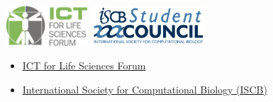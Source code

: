 \documentclass[10pt,]{article}
\begin{document}
 \vspace{2ex}
\begin{minipage}[c]{0.5\columnwidth}
    \centering
    \includegraphics[height=15mm]{./images/ICT-for-Life-Sciences-Forum-logo.png}\quad
    \includegraphics[height=15mm]{./images/ISCBSC-logo.png}
\end{minipage}
\begin{minipage}[c]{0.5\columnwidth}
\begin{itemize}
    \itemsep1pt\parskip0pt
    \item
      \href{http://www.ict4lifesciences.org.au}{ICT for Life Sciences Forum}
    \item
      \href{http://www.iscb.org}{International Society for Computational
      Biology (ISCB)}
    \end{itemize}
\end{minipage}


\vfill
\end{document}
